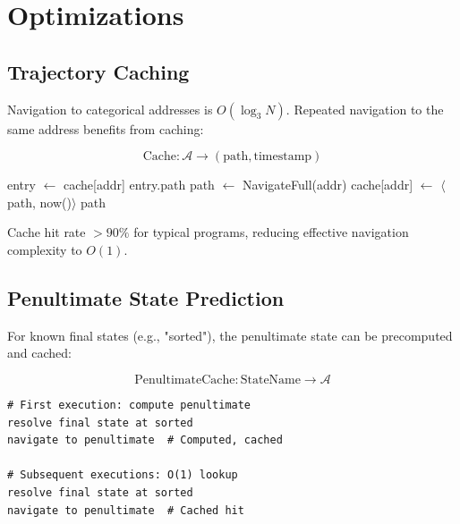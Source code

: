 \documentclass[twocolumn,10pt]{article}
\newcommand{\cataddr}{\mathcal{A}}
\theoremstyle{definition}
\theoremstyle{remark}
\begin{document}
\section{Optimizations}
\label{sec:optimization}

\subsection{Trajectory Caching}

Navigation to categorical addresses is $O(\log_3 N)$. Repeated navigation to the same address benefits from caching:

\begin{equation}
    \text{Cache}: \cataddr \to (\text{path}, \text{timestamp})
\end{equation}

\begin{algorithm}
\caption{Navigate with Caching}
\begin{algorithmic}[1]
        \State entry $\gets$ cache[addr]
            \State \Return entry.path
        \EndIf
    \EndIf
    \State path $\gets$ NavigateFull(addr)
    \State cache[addr] $\gets$ $\langle$path, now()$\rangle$
    \State \Return path
\EndFunction
\end{algorithmic}
\end{algorithm}

Cache hit rate $> 90\%$ for typical programs, reducing effective navigation complexity to $O(1)$.

\subsection{Penultimate State Prediction}

For known final states (e.g., "sorted"), the penultimate state can be precomputed and cached:

\begin{equation}
    \text{PenultimateCache}: \text{StateName} \to \cataddr
\end{equation}

\begin{lstlisting}
# First execution: compute penultimate
resolve final state at sorted
navigate to penultimate  # Computed, cached

# Subsequent executions: O(1) lookup
resolve final state at sorted
navigate to penultimate  # Cached hit
\end{lstlisting}
\end{document}
